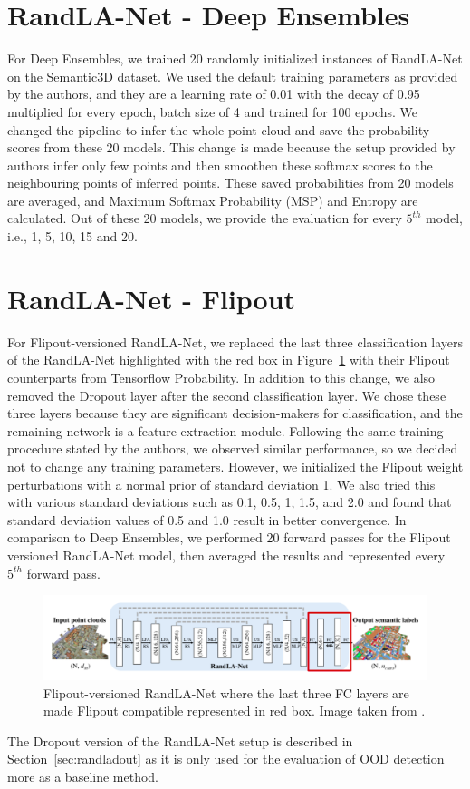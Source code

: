     \section{RandLA-Net - Deep Ensembles}
    \label{sec:de_setup}
    For Deep Ensembles, we trained 20 randomly initialized instances of RandLA-Net on the Semantic3D dataset.
    We used the default training parameters as provided by the authors, and they are a learning rate of 0.01 with the decay of 0.95 multiplied for every epoch, batch size of 4 and trained for 100 epochs.
    We changed the pipeline to infer the whole point cloud and save the probability scores from these 20 models.
    This change is made because the setup provided by authors infer only few points and then smoothen these softmax scores to the neighbouring points of inferred points.
    These saved probabilities from 20 models are averaged, and Maximum Softmax Probability (MSP) and Entropy are calculated.
    Out of these 20 models, we provide the evaluation for every $5^{th}$ model, i.e., 1, 5, 10, 15 and 20.
    \section{RandLA-Net - Flipout}
    \label{sec:flipout_setup}
    For Flipout-versioned RandLA-Net, we replaced the last three classification layers of the RandLA-Net highlighted with the red box in Figure~\ref{fig:fout_randlanet} with their Flipout counterparts from Tensorflow Probability.
    In addition to this change, we also removed the Dropout layer after the second classification layer.
    We chose these three layers because they are significant decision-makers for classification, and the remaining network is a feature extraction module.
    Following the same training procedure stated by the authors, we observed similar performance, so we decided not to change any training parameters.
    However, we initialized the Flipout weight perturbations with a normal prior of standard deviation 1.
    We also tried this with various standard deviations such as 0.1, 0.5, 1, 1.5, and 2.0 and found that standard deviation values of 0.5 and 1.0 result in better convergence.
    In comparison to Deep Ensembles, we performed 20 forward passes for the Flipout versioned RandLA-Net model, then averaged the results and represented every $5^{th}$ forward pass.
    \begin{figure}
        \centering
        \includegraphics[scale=0.42]{images/fout_randlanet.png}
        \caption{Flipout-versioned RandLA-Net where the last three FC layers are made Flipout compatible represented in red box. Image taken from \cite{Hu_2020_CVPR_Randla}.}
        \label{fig:fout_randlanet}
    \end{figure}
    The Dropout version of the RandLA-Net setup is described in Section~\ref{sec:randladout} as it is only used for the evaluation of OOD detection more as a baseline method.

